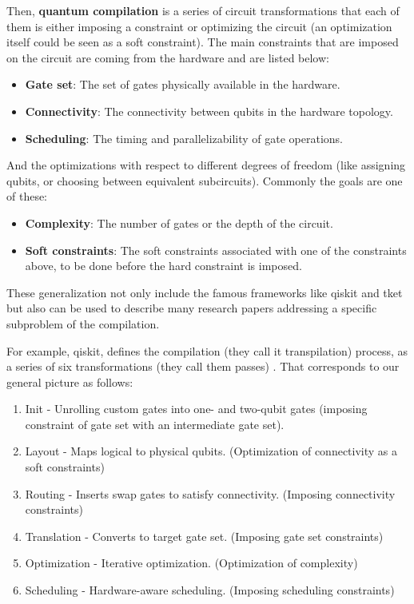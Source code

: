 \documentclass{report}
\begin{document}
Then, \textbf{quantum compilation} is a series of circuit transformations that each of them is either imposing a constraint or optimizing the circuit (an optimization itself could be seen as a soft constraint). The main constraints that are imposed on the circuit are coming from the hardware and are listed below:

\begin{itemize}
  \item \textbf{Gate set}: The set of gates physically available in the hardware.
  \item \textbf{Connectivity}: The connectivity between qubits in the hardware topology.
  \item \textbf{Scheduling}: The timing and parallelizability of gate operations.
\end{itemize}
  
And the optimizations with respect to different degrees of freedom (like assigning qubits, or choosing between equivalent subcircuits). Commonly the goals are one of these:

\begin{itemize}
  \item \textbf{Complexity}: The number of gates or the depth of the circuit.
  \item \textbf{Soft constraints}: The soft constraints associated with one of the constraints above, to be done before the hard constraint is imposed.
\end{itemize}

These generalization not only include the famous frameworks like qiskit and tket \cite{qiskit2023,sivarajah2021} but also can be used to describe many research papers addressing a specific subproblem of the compilation.

For example, qiskit\texttrademark, defines the compilation (they call it transpilation) process, as a series of six transformations (they call them passes) \cite{qiskit2023}. That corresponds to our general picture as follows:

\begin{enumerate}
  \item Init - Unrolling custom gates into one- and two-qubit gates (imposing constraint of gate set with an intermediate gate set).
  \item Layout - Maps logical to physical qubits. (Optimization of connectivity as a soft constraints)
  \item Routing - Inserts swap gates to satisfy connectivity. (Imposing connectivity constraints)
  \item Translation - Converts to target gate set. (Imposing gate set constraints)
  \item Optimization - Iterative optimization. (Optimization of complexity)
  \item Scheduling - Hardware-aware scheduling. (Imposing scheduling constraints)
\end{enumerate}
\end{document}
